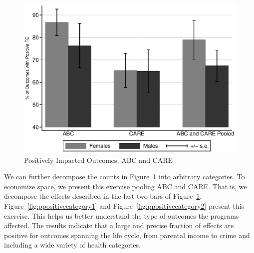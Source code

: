 \begin{figure}[H]
		\caption{Positively Impacted Outcomes, ABC and CARE} \label{fig:ppositive}
		\includegraphics[width=.9\columnwidth]{output/itt_noctrl_all.eps}
\end{figure}

\noindent We can further decompose the counts in Figure~\ref{fig:ppositive} into arbitrary categories. To economize space, we present this exercise pooling ABC and CARE. That is, we decompose the effects described in the last two bars of Figure~\ref{fig:ppositive}. Figure~\ref{fig:ppositivecategory1} and Figure~\ref{fig:ppositivecategory2} present this exercise. This helps us better understand the type of outcomes the programs affected. The results indicate that a large and precise fraction of effects are positive for outcomes spanning the life cycle, from parental income to crime and including a wide variety of health categories.\\

